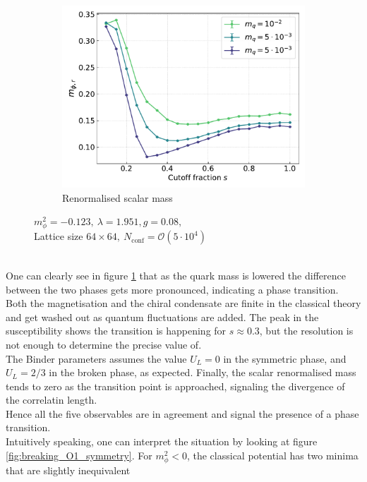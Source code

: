 \begin{figure}[h!]
\begin{subfigure}{0.47\textwidth}
    \includegraphics[width=\textwidth]{figures/chiral_PT/mphir.pdf}
    \caption{Renormalised scalar mass}
\end{subfigure}
\caption{$m_\phi^2=-0.123, \ \lambda=1.951, g=0.08,$ \\ Lattice size $64 \times 64, \ N_\text{conf} = \mathcal{O}(5 \cdot 10^4)$}
\label{fig:chiral:symmetry_breaking}
\end{figure}\\
One can clearly see in figure \ref{fig:chiral:symmetry_breaking} that as the quark  mass is lowered the difference between the two phases gets more pronounced, indicating a phase transition. \\
Both the magnetisation and the chiral condensate are finite in the classical theory and get washed out as quantum fluctuations are added. 
The peak in the susceptibility shows the transition is happening for $s \approx 0.3$, but the resolution is not enough to determine the precise value of. \\ 
The Binder parameters assumes the value $U_L = 0$ in the symmetric phase, and $U_L=2/3$ in the broken phase, as expected. Finally, the scalar renormalised mass tends to zero as the transition point is approached, signaling the divergence of the correlatin length. \\
Hence all the five observables are in agreement and signal the presence of a phase transition. \\
Intuitively speaking, one can interpret the situation by looking at figure \ref{fig:breaking_O1_symmetry}. For $m_\phi^2 < 0$, the classical potential has two minima that are slightly inequivalent 
